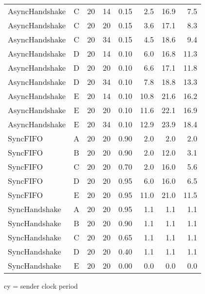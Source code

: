 \begin{tabular}{lc|*{6}{r}}
 AsyncHandshake & C &  20 & 14 & 0.15  & 2.5 & 16.9 & 7.5 \\[0ex]
 AsyncHandshake & C &  20 & 20 & 0.15  & 3.6 & 17.1 & 8.3 \\[0ex]
 AsyncHandshake & C &  20 & 34 & 0.15  & 4.5 & 18.6 & 9.4 \\[0ex]
 AsyncHandshake & D &  20 & 14 & 0.10  & 6.0 & 16.8 & 11.3 \\[0ex]
 AsyncHandshake & D &  20 & 20 & 0.10  & 6.6 & 17.1 & 11.8 \\[0ex]
 AsyncHandshake & D &  20 & 34 & 0.10  & 7.8 & 18.8 & 13.3 \\[0ex]
 AsyncHandshake & E &  20 & 14 & 0.10  & 10.8 & 21.6 & 16.2 \\[0ex]
 AsyncHandshake & E &  20 & 20 & 0.10  & 11.6 & 22.1 & 16.9 \\[0ex]
 AsyncHandshake & E &  20 & 34 & 0.10  & 12.9 & 23.9 & 18.4 \\[0ex]
\hline
 SyncFIFO & A &  20 & 20 & 0.90  & 2.0 & 2.0 & 2.0 \\[0ex]
 SyncFIFO & B &  20 & 20 & 0.90  & 2.0 & 12.0 & 3.1 \\[0ex]
 SyncFIFO & C &  20 & 20 & 0.70  & 2.0 & 16.0 & 5.6 \\[0ex]
 SyncFIFO & D &  20 & 20 & 0.95  & 6.0 & 16.0 & 6.5 \\[0ex]
 SyncFIFO & E &  20 & 20 & 0.95  & 11.0 & 21.0 & 11.5 \\[0ex]
\hline
 SyncHandshake & A &  20 & 20 & 0.95  & 1.1 & 1.1 & 1.1 \\[0ex]
 SyncHandshake & B &  20 & 20 & 0.90  & 1.1 & 1.1 & 1.1 \\[0ex]
 SyncHandshake & C &  20 & 20 & 0.65  & 1.1 & 1.1 & 1.1 \\[0ex]
 SyncHandshake & D &  20 & 20 & 0.40  & 1.1 & 1.1 & 1.1 \\[0ex]
 SyncHandshake & E &  20 & 20 & 0.00  & 0.0 & 0.0 & 0.0 \\[0ex]
\hline
\end{tabular}
 
cy = sender clock period
 
